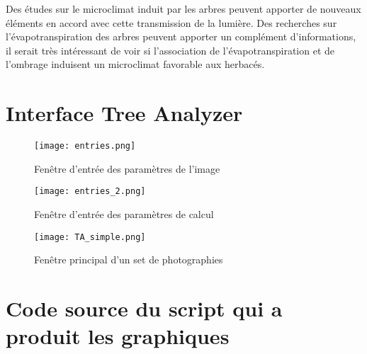 \documentclass[12pt]{report}
\begin{document}
Des études sur le microclimat induit par les arbres peuvent apporter de nouveaux
éléments en accord avec cette transmission de la lumière. Des recherches sur
l'évapotranspiration des arbres peuvent apporter un complément d'informations,
il serait très intéressant de voir si l'association de l'évapotranspiration et
de l'ombrage induisent un microclimat favorable aux herbacés.





\appendix

\chapter{Interface Tree Analyzer}\label{App:appxA}

\begin{figure}
  \centering
  \texttt{[image: entries.png]}
  \caption{Fenêtre d'entrée des paramètres de l'image}
\end{figure}

\begin{figure}
  \centering
  \texttt{[image: entries\_2.png]}
  \caption{Fenêtre d'entrée des paramètres de calcul}
\end{figure}

\begin{figure}
  \centering
  \texttt{[image: TA\_simple.png]}
  \caption{Fenêtre principal d'un set de photographies}
\end{figure}



\chapter{Code source du script qui a produit les graphiques}\label{App:appxB}
\end{document}
